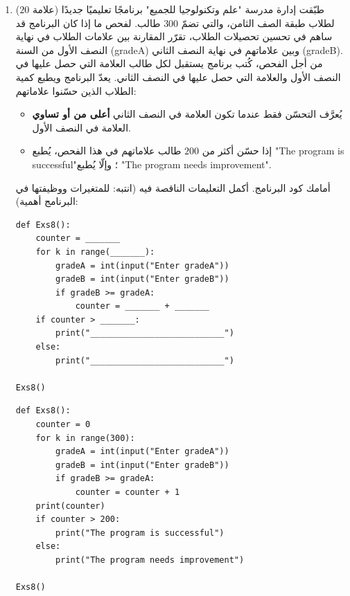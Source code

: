 \documentclass[14pt]{extarticle}
\begin{document}
\begin{enumerate}[resume, label=\textbf{السؤال \arabic*:}, wide=0pt, itemsep=2.2em]
\item ($20$ علامة) طبّقت إدارة مدرسة "علم وتكنولوجيا للجميع" برنامجًا تعليميًا جديدًا لطلاب طبقة الصف الثامن، والتي تضمّ $300$ طالب. لفحص ما إذا كان البرنامج قد ساهم في تحسين تحصيلات الطلاب، تقرّر المقارنة بين علامات الطلاب في نهاية النصف الأول من السنة (\textenglish{gradeA}) وبين علاماتهم في نهاية النصف الثاني (\textenglish{gradeB}).
من أجل الفحص، كُتب برنامج يستقبل لكل طالب العلامة التي حصل عليها في النصف الأول والعلامة التي حصل عليها في النصف الثاني. يعدّ البرنامج ويطبع كمية الطلاب الذين حسّنوا علاماتهم:
\begin{itemize}
\item يُعرَّف التحسّن فقط عندما تكون العلامة في النصف الثاني \textbf{أعلى من أو تساوي} العلامة في النصف الأول.
\item إذا حسّن أكثر من $200$ طالب علاماتهم في هذا الفحص، يُطبع \textenglish{"The program is successful"}؛ وإلّا يُطبع \textenglish{"The program needs improvement"}.
\end{itemize}
أمامك كود البرنامج. أكمل التعليمات الناقصة فيه (انتبه: للمتغيرات ووظيفتها في البرنامج أهمية):

\begin{boxCode}
\begin{english}
\begin{verbatim}
def Exs8():
    counter = _______
    for k in range(_______):
        gradeA = int(input("Enter gradeA"))
        gradeB = int(input("Enter gradeB"))
        if gradeB >= gradeA:
            counter = _______ + _______
    if counter > _______:
        print("___________________________")
    else:
        print("___________________________")

Exs8()
\end{verbatim}
\end{english}
\end{boxCode}

\ifwithsols
\begin{boxSolution}
\begin{english}
\begin{verbatim}
def Exs8():
    counter = 0
    for k in range(300):
        gradeA = int(input("Enter gradeA"))
        gradeB = int(input("Enter gradeB"))
        if gradeB >= gradeA:
            counter = counter + 1
    print(counter)
    if counter > 200:
        print("The program is successful")
    else:
        print("The program needs improvement")

Exs8()
\end{verbatim}
\end{english}
\end{boxSolution}
\fi
\filbreak


\end{enumerate}
\end{document}

